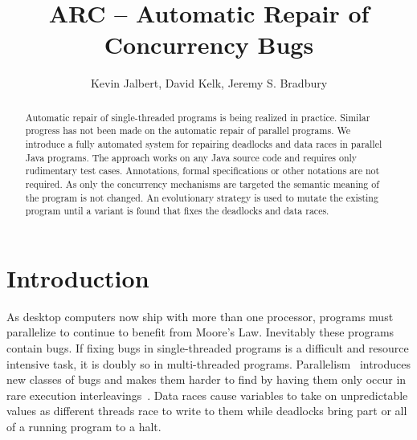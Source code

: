 \documentclass{llncs}
\begin{document}
\title{ARC -- Automatic Repair of Concurrency Bugs}

\author{Kevin Jalbert, David Kelk, Jeremy S. Bradbury}


\maketitle

\begin{abstract}

Automatic repair of single-threaded programs is being realized in practice.
Similar progress has not been made on the automatic repair of parallel
programs. We introduce a fully automated system for repairing
deadlocks and data races in parallel Java programs. The approach works on any
Java source code and requires only rudimentary test cases. Annotations, formal
specifications or other notations are not required. As only the concurrency
mechanisms are targeted the semantic meaning of the program is not changed. 
An evolutionary strategy is used to mutate the existing program
until a variant is found that fixes the deadlocks and data races. 

\end{abstract}

\section{Introduction}
\label{sec:introduction}

As desktop computers now ship with more than one processor, programs must
parallelize to continue to benefit from Moore's Law. Inevitably these programs
contain bugs. If fixing bugs in single-threaded programs is a difficult and
resource intensive task,  it is doubly so in multi-threaded programs.
Parallelism~\cite{SL05} introduces new classes of bugs and makes them harder to
find by having them only occur in rare execution interleavings~\cite{MQB07}.
Data races cause variables to take on unpredictable values as different threads
race to write to them while deadlocks bring part or all of a running program to
a halt.
\end{document}
